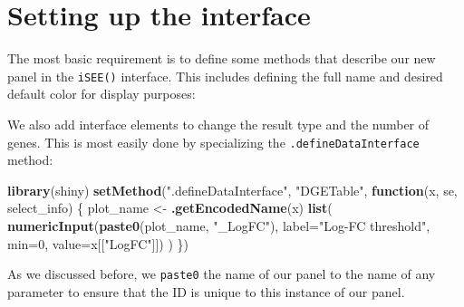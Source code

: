 \documentclass[
]{book}
\newenvironment{Shaded}{\begin{snugshade}}{\end{snugshade}}
\newcommand{\ControlFlowTok}[1]{\textcolor[rgb]{0.13,0.29,0.53}{\textbf{#1}}}
\newcommand{\DataTypeTok}[1]{\textcolor[rgb]{0.13,0.29,0.53}{#1}}
\newcommand{\DecValTok}[1]{\textcolor[rgb]{0.00,0.00,0.81}{#1}}
\newcommand{\KeywordTok}[1]{\textcolor[rgb]{0.13,0.29,0.53}{\textbf{#1}}}
\newcommand{\NormalTok}[1]{#1}
\newcommand{\StringTok}[1]{\textcolor[rgb]{0.31,0.60,0.02}{#1}}
\begin{document}
\hypertarget{setting-up-the-interface}{%
\section{Setting up the interface}\label{setting-up-the-interface}}

The most basic requirement is to define some methods that describe our new panel in the \texttt{iSEE()} interface.
This includes defining the full name and desired default color for display purposes:

\begin{Shaded}
\end{Shaded}

We also add interface elements to change the result type and the number of genes.
This is most easily done by specializing the \texttt{.defineDataInterface} method:

\begin{Shaded}
\begin{Highlighting}[]
\KeywordTok{library}\NormalTok{(shiny)}
\KeywordTok{setMethod}\NormalTok{(}\StringTok{".defineDataInterface"}\NormalTok{, }\StringTok{"DGETable"}\NormalTok{, }\ControlFlowTok{function}\NormalTok{(x, se, select_info) \{}
\NormalTok{    plot_name <-}\StringTok{ }\KeywordTok{.getEncodedName}\NormalTok{(x)}
    \KeywordTok{list}\NormalTok{(}
        \KeywordTok{numericInput}\NormalTok{(}\KeywordTok{paste0}\NormalTok{(plot_name, }\StringTok{"_LogFC"}\NormalTok{), }\DataTypeTok{label=}\StringTok{"Log-FC threshold"}\NormalTok{,}
            \DataTypeTok{min=}\DecValTok{0}\NormalTok{, }\DataTypeTok{value=}\NormalTok{x[[}\StringTok{"LogFC"}\NormalTok{]])}
\NormalTok{    )}
\NormalTok{\})}
\end{Highlighting}
\end{Shaded}

As we discussed before, we \texttt{paste0} the name of our panel to the name of any parameter to ensure that the ID is unique to this instance of our panel.
\end{document}
